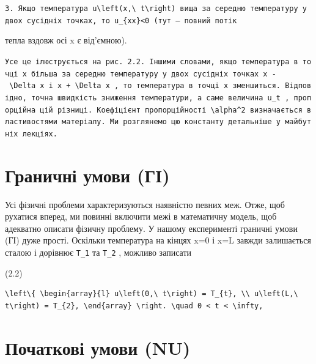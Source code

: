 \documentclass[
  ukrainian,
]{article}
\begin{document}
\texttt{3.\ Якщо\ температура\ \textquotesingle{}u\textbackslash{}left(x,\textbackslash{}\ t\textbackslash{}right)\textquotesingle{}\ вища\ за\ середню\ температуру\ у\ двох\ сусідніх\ точках,\ то\ \textquotesingle{}u\_\{xx\}\textless{}0\textquotesingle{}\ (тут\ —\ повний\ потік}

тепла вздовж осі x є від'ємною).

\texttt{Усе\ це\ ілюструється\ на\ рис.\ 2.2.\ Іншими\ словами,\ якщо\ температура\ в\ точці\ x\ більша\ за\ середню\ температуру\ у\ двох\ сусідніх\ точках\ \textquotesingle{}x\ -\ \textbackslash{}Delta\ x\textquotesingle{}\ і\ \textquotesingle{}x\ +\ \textbackslash{}Delta\ x\textquotesingle{}\ ,\ то\ температура\ в\ точці\ x\ зменшиться.\ Відповідно,\ точна\ швидкість\ зниження\ температури,\ а\ саме\ величина\ \textquotesingle{}u\_t\textquotesingle{}\ ,\ пропорційна\ цій\ різниці.\ Коефіцієнт\ пропорційності\ \textquotesingle{}\textbackslash{}alpha\^{}2\textquotesingle{}\ визначається\ властивостями\ матеріалу.\ Ми\ розглянемо\ цю\ константу\ детальніше\ у\ майбутніх\ лекціях.}

\section{Граничні умови
(ГІ)}\label{ux433ux440ux430ux43dux438ux447ux43dux456-ux443ux43cux43eux432ux438-ux433ux456}

Усі фізичні проблеми характеризуються наявністю певних меж. Отже, щоб
рухатися вперед, ми повинні включити межі в математичну модель, щоб
адекватно описати фізичну проблему. У нашому експерименті граничні умови
(ГІ) дуже прості. Оскільки температура на кінцях x=0 і x=L завжди
залишається сталою і дорівнює \texttt{T\_1} та \texttt{T\_2} , можливо
записати

(2.2)

\begin{verbatim}
\left\{ \begin{array}{l} u\left(0,\ t\right) = T_{t}, \\ u\left(L,\ t\right) = T_{2}, \end{array} \right. \quad 0 < t < \infty,
\end{verbatim}

\section{Початкові умови
(NU)}\label{ux43fux43eux447ux430ux442ux43aux43eux432ux456-ux443ux43cux43eux432ux438-nu}
\end{document}
